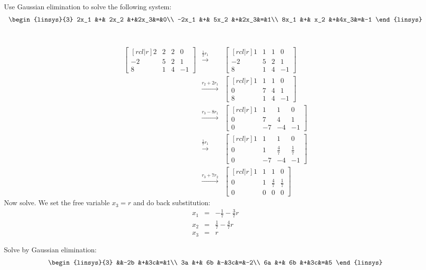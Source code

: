 \ii \label{1.1-1.2:A}
\noindent Use Gaussian elimination to solve the following system:
\[
\begin{linsys}{3}
2x_1 &+& 2x_2  &+&2x_3&=&0\\
-2x_1 &+& 5x_2 &+&2x_3&=&1\\
8x_1 &+&  x_2   &+&4x_3&=&-1
\end{linsys}
\]
\\
\begin{solution}
\begin{eqnarray*}
\begin{bmatrix}[rcl|r]
2&2&2&0\\
-2&5&2&1\\
8&1&4&-1
\end{bmatrix}
&\xrightarrow[]{\frac{1}{2}r_1}&
\begin{bmatrix}[rcl|r]
1&1&1&0\\
-2&5&2&1\\
8&1&4&-1
\end{bmatrix}
\\
&\xrightarrow[]{r_2+2r_1}&
\begin{bmatrix}[rcl|r]
1&1&1&0\\
0&7&4&1\\
8&1&4&-1
\end{bmatrix}
\\
&\xrightarrow[]{r_3-8r_1}&
\begin{bmatrix}[rcl|r]
1&1&1&0\\
0&7&4&1\\
0&-7&-4&-1
\end{bmatrix}
\\
&\xrightarrow[]{\frac{1}{7}r_1}&
\begin{bmatrix}[rcl|r]
1&1&1&0\\
0&1&\frac{4}{7}&\frac{1}{7}\\
0&-7&-4&-1
\end{bmatrix}
\\
&\xrightarrow[]{r_3+7r_2}&
\begin{bmatrix}[rcl|r]
1&1&1&0\\
0&1&\frac{4}{7}&\frac{1}{7}\\
0&0&0&0
\end{bmatrix}
\end{eqnarray*}
Now solve. We set the free variable $x_3=r$ and do back substitution: 
\begin{eqnarray*}
x_1&=&-\frac{1}{7}-\frac{3}{7}r \\
x_2&=&\frac{1}{7}-\frac{4}{7}r \\
x_3&=& r
\end{eqnarray*}
\end{solution}
\ii
\noindent Solve by Gaussian elimination:
\[
\begin{linsys}{3}
&&-2b  &+&3c&=&1\\
3a &+& 6b &-&3c&=&-2\\
6a &+&  6b   &+&3c&=&5
\end{linsys}
\]

